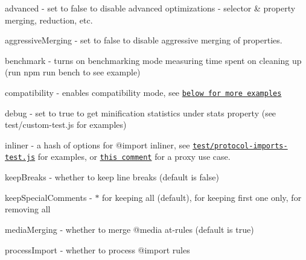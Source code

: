 \begin{DoxyItemize}
\item {\ttfamily advanced} -\/ set to false to disable advanced optimizations -\/ selector \& property merging, reduction, etc.
\item {\ttfamily aggressive\+Merging} -\/ set to false to disable aggressive merging of properties.
\item {\ttfamily benchmark} -\/ turns on benchmarking mode measuring time spent on cleaning up (run {\ttfamily npm run bench} to see example)
\item {\ttfamily compatibility} -\/ enables compatibility mode, see \href{#how-to-set-a-compatibility-mode}{\tt below for more examples}
\item {\ttfamily debug} -\/ set to true to get minification statistics under {\ttfamily stats} property (see {\ttfamily test/custom-\/test.\+js} for examples)
\item {\ttfamily inliner} -\/ a hash of options for {\ttfamily @import} inliner, see \href{https://github.com/jakubpawlowicz/clean-css/blob/master/test/protocol-imports-test.js#L372}{\tt test/protocol-\/imports-\/test.\+js} for examples, or \href{https://github.com/jakubpawlowicz/clean-css/issues/612#issuecomment-119594185}{\tt this comment} for a proxy use case.
\item {\ttfamily keep\+Breaks} -\/ whether to keep line breaks (default is false)
\item {\ttfamily keep\+Special\+Comments} -\/ {\ttfamily $\ast$} for keeping all (default), {} for keeping first one only, {} for removing all
\item {\ttfamily media\+Merging} -\/ whether to merge {\ttfamily @media} at-\/rules (default is true)
\item {\ttfamily process\+Import} -\/ whether to process {\ttfamily @import} rules

\end{DoxyItemize}
